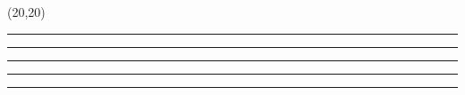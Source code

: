 \documentclass[11pt]{article}
\newcommand{\separator}{\noindent\rule{\linewidth}{0.1mm}}
\newcommand{\votebox}{\vspace{-5cm}\noindent\hfill\framebox(20,20){}}
\newcommand{\hstrut}{\noindent\color{iclightblue}\rule{\linewidth}{0pt}}
\begin{document}
\vfill
\noindent
\begin{minipage}[b]{0.49\linewidth}
\votebox%
\end{minipage}
\begin{minipage}[b]{0.02\linewidth}
\hstrut%
\end{minipage}
\begin{minipage}[b]{0.49\linewidth}
\hstrut%
\end{minipage}
\noindent
\begin{minipage}[t]{0.49\linewidth}
\separator%
\end{minipage}
\begin{minipage}[t]{0.02\linewidth}
\hstrut%
\end{minipage}
\begin{minipage}[t]{0.49\linewidth}
\hstrut%
\end{minipage}
\end{document}
